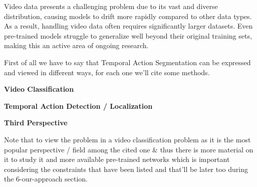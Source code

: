Video data presents a challenging problem due to its vast and diverse distribution, causing models to drift more rapidly compared to other data types. As a result, handling video data often requires significantly larger datasets. Even pre-trained models struggle to generalize well beyond their original training sets, making this an active area of ongoing research.

First of all we have to say that Temporal Action Segmentation can be expressed and viewed in different ways, for each one we'll cite some methods.

\textbf{Video Classification}

\textbf{Temporal Action Detection / Localization}

\textbf{Third Perspective}

Note that to view the problem in a video classification problem as it is the most popular perspective / field among the cited one \& thus there is more material on it to study it and more available pre-trained networks which is important considering the constraints that have been listed and that'll be later too during the 6-our-approach section.

